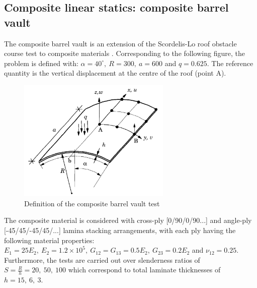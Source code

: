 \subsection{Composite linear statics: composite barrel vault}
\label{validation:composite barrel vault}
The composite barrel vault is an extension of the Scordelis-Lo roof obstacle course test to composite materials \cite{reddy2004mechanics}. Corresponding to the following figure, the problem is defined with: $\alpha = 40^{\circ},\ R = 300,\ a = 600$ and $q = 0.625$. The reference quantity is the vertical displacement at the centre of the roof (point A).

\begin{figure}[H]
	\centering
	\def\svgwidth{\columnwidth}
	\includegraphics[width=7.3cm]{images/composite_barrel_vault_def.png}
	\caption{Definition of the composite barrel vault test \cite{reddy2004mechanics}}
\end{figure}

The composite material is considered with cross-ply [0/90/0/90...] and angle-ply [-45/45/-45/45/...] lamina stacking arrangements, with each ply having the following material properties: $E_1 = 25 E_2,\ E_2 = 1.2 \times 10^5,\ G_{12} = G_{13} = 0.5 E_2,\ G_{23} = 0.2 E_2$ and $\nu_{12} = 0.25$. Furthermore, the tests are carried out over slenderness ratios of $S = \frac{R}{h} = 20,\ 50,\ 100$ which correspond to total laminate thicknesses of $h = 15,\ 6,\ 3$.

